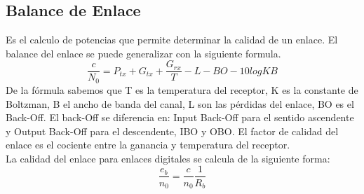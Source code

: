 	\subsection{Balance de Enlace}
	\label{sub:balance}
		Es el calculo de potencias que permite determinar la calidad de un enlace. El balance del enlace se puede generalizar con la siguiente formula.
		\begin{equation}
			\tag{Balance de enlace}
			\frac{c}{N_0}=P_{tx}+G_{tx}+\frac{G_{rx}}{T}-L-BO-10logKB
		\end{equation}
		De la fórmula sabemos que T es la temperatura del receptor, K es la constante de Boltzman, B el ancho de banda del canal, L son las pérdidas del enlace, BO es el Back-Off. El back-Off se diferencia en: Input Back-Off para el sentido ascendente y Output Back-Off para el descendente, IBO y OBO. El factor de calidad del enlace es el cociente entre la ganancia y temperatura del receptor.\\
		La calidad del enlace para enlaces digitales se calcula de la siguiente forma:
		\begin{equation}
			\tag{Balance de enlace digital}
			\frac{e_b}{n_0}=\frac{c}{n_0}\frac{1}{R_b}
		\end{equation}
